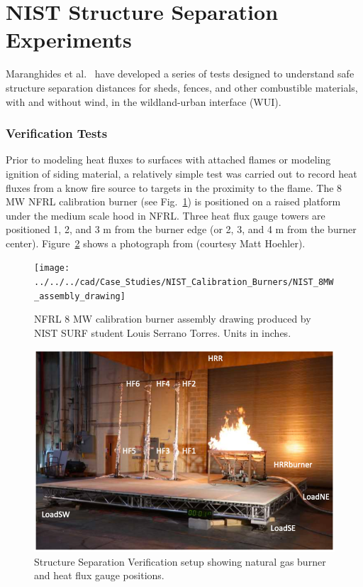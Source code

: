 \section{NIST Structure Separation Experiments}
\label{NIST_Structure_Separation_Description}

Maranghides et al.~\cite{Maranghides:TN2161,Maranghides:TN2235} have developed a series of tests designed to understand safe structure separation distances for sheds, fences, and other combustible materials, with and without wind, in the wildland-urban interface (WUI).

\subsubsection{Verification Tests}

Prior to modeling heat fluxes to surfaces with attached flames or modeling ignition of siding material, a relatively simple test was carried out to record heat fluxes from a know fire source to targets in the proximity to the flame.  The 8 MW NFRL calibration burner \cite{Bryant:NISTSP1007} (see Fig.~\ref{NFRL_8MW_calibration_burner}) is positioned on a raised platform under the medium scale hood in NFRL.  Three heat flux gauge towers are positioned 1, 2, and 3 m from the burner edge (or 2, 3, and 4 m from the burner center).  Figure~\ref{NIST_SSE_Verification_Setup} shows a photograph from \cite{Maranghides:TN2235} (courtesy Matt Hoehler).

\begin{figure}[h]
\centering
\texttt{[image: ../../../cad/Case\_Studies/NIST\_Calibration\_Burners/NIST\_8MW\_assembly\_drawing]}
\caption[NFRL 8 MW calibration burner assembly drawing]{NFRL 8 MW calibration burner assembly drawing produced by NIST SURF student Louis Serrano Torres.  Units in inches.}
\label{NFRL_8MW_calibration_burner}
\end{figure}

\begin{figure}[h]
\centering
\includegraphics[width=.75\textwidth]{FIGURES/NIST_Structure_Separation/SSE_Verification_Exp_Setup}
\caption[Structure Separation Verification setup]{Structure Separation Verification setup showing natural gas burner and heat flux gauge positions.}
\label{NIST_SSE_Verification_Setup}
\end{figure}

